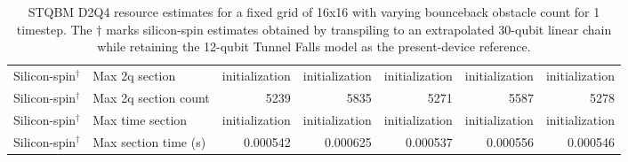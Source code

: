 \begin{table}
\begin{tabular}{llrrrrr}
Silicon-spin$^{\dagger}$ & Max 2q section & initialization & initialization & initialization & initialization & initialization \\
Silicon-spin$^{\dagger}$ & Max 2q section count & 5239 & 5835 & 5271 & 5587 & 5278 \\
Silicon-spin$^{\dagger}$ & Max time section & initialization & initialization & initialization & initialization & initialization \\
Silicon-spin$^{\dagger}$ & Max section time (s) & 0.000542 & 0.000625 & 0.000537 & 0.000556 & 0.000546 \\
\hline
\end{tabular}
\caption{STQBM D2Q4 resource estimates for a fixed grid of 16x16 with varying bounceback obstacle count for 1 timestep. The \(\dagger\) marks silicon-spin estimates obtained by transpiling to an extrapolated 30-qubit linear chain while retaining the 12-qubit Tunnel Falls model as the present-device reference.}
\label{tab:spacetimeqlbm-obstacle-resources}
\end{table}
